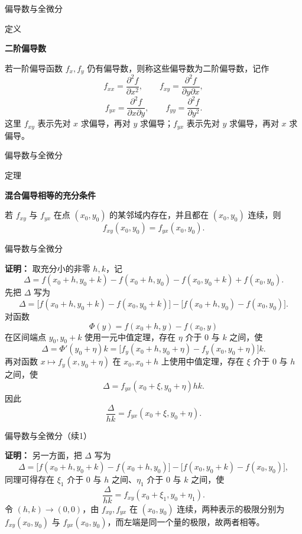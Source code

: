 \documentclass[aspectratio=169,10pt,fontset=fandol]{ctexbeamer}
\begin{document}
\begin{frame}[t,fragile]{偏导数与全微分}
\footnotesize
\begin{block}{定义}
{\footnotesize
\textbf{二阶偏导数}\par

若一阶偏导函数 $f_x,f_y$ 仍有偏导数，则称这些偏导数为二阶偏导数，记作
\[
f_{xx}=\frac{\partial^2 f}{\partial x^2},\qquad
f_{xy}=\frac{\partial^2 f}{\partial y\partial x},
\]
\[
f_{yx}=\frac{\partial^2 f}{\partial x\partial y},\qquad
f_{yy}=\frac{\partial^2 f}{\partial y^2}.
\]
这里 $f_{xy}$ 表示先对 $x$ 求偏导，再对 $y$ 求偏导；$f_{yx}$ 表示先对 $y$ 求偏导，再对 $x$ 求偏导。

}
\end{block}
\end{frame}
\begin{frame}[t,fragile]{偏导数与全微分}
\footnotesize
\begin{block}{定理}
{\footnotesize
\textbf{混合偏导相等的充分条件}\par

若 $f_{xy}$ 与 $f_{yx}$ 在点 $(x_0,y_0)$ 的某邻域内存在，并且都在 $(x_0,y_0)$ 连续，则
\[
f_{xy}(x_0,y_0)=f_{yx}(x_0,y_0).
\]

}
\end{block}
\end{frame}
\begin{frame}[t,fragile]{偏导数与全微分}
\footnotesize
{\footnotesize
\textbf{证明：}
取充分小的非零 $h,k$，记
\[
\Delta=f(x_0+h,y_0+k)-f(x_0+h,y_0)-f(x_0,y_0+k)+f(x_0,y_0).
\]
先把 $\Delta$ 写为
\[
\Delta=\bigl[f(x_0+h,y_0+k)-f(x_0,y_0+k)\bigr]
-\bigl[f(x_0+h,y_0)-f(x_0,y_0)\bigr].
\]
对函数
\[
\Phi(y)=f(x_0+h,y)-f(x_0,y)
\]
在区间端点 $y_0,y_0+k$ 使用一元中值定理，存在 $\eta$ 介于 $0$ 与 $k$ 之间，使
\[
\Delta=\Phi'(y_0+\eta)k
=\bigl[f_y(x_0+h,y_0+\eta)-f_y(x_0,y_0+\eta)\bigr]k.
\]
再对函数 $x\mapsto f_y(x,y_0+\eta)$ 在 $x_0,x_0+h$ 上使用中值定理，存在 $\xi$ 介于 $0$ 与 $h$ 之间，使
\[
\Delta=f_{yx}(x_0+\xi,y_0+\eta)hk.
\]
因此
\[
\frac{\Delta}{hk}=f_{yx}(x_0+\xi,y_0+\eta).
\]


}
\end{frame}
\begin{frame}[t,fragile]{偏导数与全微分（续1）}
\footnotesize
{\footnotesize
\textbf{证明：}
另一方面，把 $\Delta$ 写为
\[
\Delta=\bigl[f(x_0+h,y_0+k)-f(x_0+h,y_0)\bigr]
-\bigl[f(x_0,y_0+k)-f(x_0,y_0)\bigr],
\]
同理可得存在 $\xi_1$ 介于 $0$ 与 $h$ 之间、$\eta_1$ 介于 $0$ 与 $k$ 之间，使
\[
\frac{\Delta}{hk}=f_{xy}(x_0+\xi_1,y_0+\eta_1).
\]
令 $(h,k)\to(0,0)$，由 $f_{xy},f_{yx}$ 在 $(x_0,y_0)$ 连续，两种表示的极限分别为 $f_{xy}(x_0,y_0)$ 与 $f_{yx}(x_0,y_0)$，而左端是同一个量的极限，故两者相等。

}
\end{frame}
\end{document}

